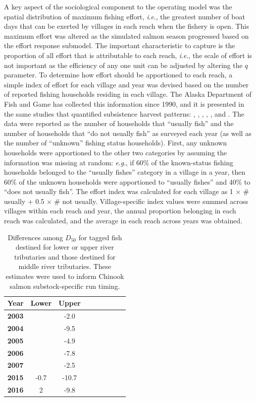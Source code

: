 \documentclass[12pt,]{book}
\theoremstyle{definition}
\theoremstyle{definition}
\theoremstyle{definition}
\theoremstyle{remark}
\begin{document}
\noindent
A key aspect of the sociological component to the operating model was
the spatial distribution of maximum fishing effort, \emph{i}.\emph{e}.,
the greatest number of boat days that can be exerted by villages in each
reach when the fishery is open. This maximum effort was altered as the
simulated salmon season progressed based on the effort response
submodel. The important characteristic to capture is the proportion of
all effort that is attributable to each reach, \emph{i}.\emph{e}., the
scale of effort is not important as the efficiency of any one unit can
be adjusted by altering the \(q\) parameter. To determine how effort
should be apportioned to each reach, a simple index of effort for each
village and year was devised based on the number of reported fishing
households residing in each village. The Alaska Department of Fish and
Game has collected this information since 1990, and it is presented in
the same studies that quantified subsistence harvest patterns:
\citet{hamazaki-2011}, \citet{carroll-hamazaki-2012},
\citet{shelden-etal-2014}, \citet{shelden-etal-2015},
\citet{shelden-etal-2016a}, and \citet{shelden-etal-2016b}. The data
were reported as the number of households that ``usually fish'' and the
number of households that ``do not usually fish'' as surveyed each year
(as well as the number of ``unknown'' fishing status households). First,
any unknown households were apportioned to the other two categories by
assuming the information was missing at random: \emph{e}.\emph{g}., if
60\% of the known-status fishing households belonged to the ``usually
fishes'' category in a village in a year, then 60\% of the unknown
households were apportioned to ``usually fishes'' and 40\% to ``does not
usually fish''. The effort index was calculated for each village as 1
\(\times\) \# usually + 0.5 \(\times\) \# not usually. Village-specific
index values were summed across villages within each reach and year, the
annual proportion belonging in each reach was calculated, and the
average in each reach across years was obtained.

\clearpage
\singlespacing

\begin{table}

\caption{\label{tab:d50-devs-table}Differences among $D_{50}$ for tagged fish destined for lower or upper river tributaries and those destined for middle river tributaries. These estimates were used to inform Chinook salmon substock-specific run timing.}
\centering
\begin{tabular}[t]{>{\bfseries}lcclcclcc}
\toprule
\textbf{Year} & \textbf{Lower} & \textbf{Upper}\\
\midrule
2003 &  & -2.0\\
2004 &  & -9.5\\
2005 &  & -4.9\\
2006 &  & -7.8\\
2007 &  & -2.5\\
2015 & -0.7 & -10.7\\
2016 & 2 & -9.8\\
\bottomrule
\end{tabular}
\end{table}
\end{document}
